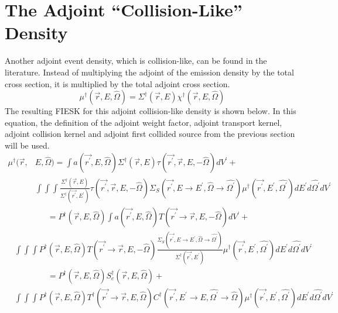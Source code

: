 \section{The Adjoint ``Collision-Like'' Density}
Another adjoint event density, which is collision-like, can be found in the 
literature. Instead of multiplying the adjoint of the emission density by the
total cross section, it is multiplied by the total adjoint cross section.
\begin{equation}
  \mu^{\dagger}(\vec{r},E,\hat{\Omega}) = \Sigma^{\dagger}(\vec{r},E)
  \chi^{\dagger}(\vec{r},E,\hat{\Omega})
  \label{eq:adj_collision_like_dens_to_adjoint_of_emission_dens}
\end{equation}
The resulting FIESK for this adjoint collision-like density is shown below.
In this equation, the definition of the adjoint weight factor, adjoint
transport kernel, adjoint collision kernel and adjoint first collided 
source from the previous section will be used.
\begin{equation*}
  \begin{split}
  \mu^{\dagger}(\vec{r},&E,\hat{\Omega}) = \int a(\vec{r^{'}},E,\hat{\Omega}) 
    \Sigma^{\dagger}(\vec{r},E) \tau(\vec{r^{'}},\vec{r},E,-\hat{\Omega}) 
    dV^{'} + \\
    & \int\int\int  \frac{\Sigma^{\dagger}(\vec{r},E)}
    {\Sigma^{\dagger}(\vec{r^{'}},E^{'})}
      \tau(\vec{r^{'}},\vec{r},E,-\hat{\Omega}) 
    \Sigma_S(\vec{r^{'}},E \to E^{'},\hat{\Omega} \to \hat{\Omega^{'}})
    \mu^{\dagger}(\vec{r^{'}},E^{'},\hat{\Omega^{'}}) dE^{'}d\hat{\Omega^{'}}dV^{'}
  \end{split}
\end{equation*}
\begin{equation*}
  \begin{split}
  \text{} & \qquad \qquad = P^{\dagger}(\vec{r},E,\hat{\Omega}) \int
    a(\vec{r^{'}},E,\hat{\Omega}) 
    T(\vec{r^{'}} \to \vec{r},E,-\hat{\Omega}) dV^{'} + \\
    & \int\int\int P^{\dagger}(\vec{r},E,\hat{\Omega}) 
    T(\vec{r^{'}} \to \vec{r},E,-\hat{\Omega})
      \frac{\Sigma_S(\vec{r^{'}},E \to E^{'},\hat{\Omega} \to \hat{\Omega^{'}})}
           {\Sigma^{\dagger}(\vec{r^{'}},E^{'})}
    \mu^{\dagger}(\vec{r^{'}},E^{'},\hat{\Omega^{'}}) dE^{'}d\hat{\Omega^{'}}dV^{'}
  \end{split}
\end{equation*}
\begin{equation*}
  \begin{split}
    \text{} & \qquad \qquad = P^{\dagger}(\vec{r},E,\hat{\Omega}) 
    S_c^{\dagger}(\vec{r},E,\hat{\Omega}) +\\
    & \int\int\int P^{\dagger}(\vec{r},E,\hat{\Omega}) 
    T^{\dagger}(\vec{r^{'}} \to \vec{r},E,\hat{\Omega})
    C^{\dagger}(\vec{r^{'}},E^{'} \to E,\hat{\Omega^{'}} \to \hat{\Omega})
    \mu^{\dagger}(\vec{r^{'}},E^{'},\hat{\Omega^{'}}) dE^{'}d\hat{\Omega^{'}}dV^{'}
  \end{split}
\end{equation*}

